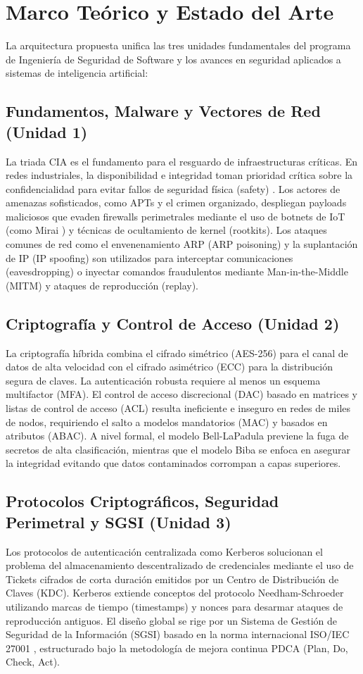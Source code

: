 \documentclass[12pt,letterpaper]{article}
\begin{document}
\section{Marco Teórico y Estado del Arte}

La arquitectura propuesta unifica las tres unidades fundamentales del programa de Ingeniería de Seguridad de Software y los avances en seguridad aplicados a sistemas de inteligencia artificial:

\subsection{Fundamentos, Malware y Vectores de Red (Unidad 1)}
La triada CIA es el fundamento para el resguardo de infraestructuras críticas. En redes industriales, la disponibilidad e integridad toman prioridad crítica sobre la confidencialidad para evitar fallos de seguridad física (safety) \cite{nist800}. Los actores de amenazas sofisticados, como APTs y el crimen organizado, despliegan payloads maliciosos que evaden firewalls perimetrales mediante el uso de botnets de IoT (como Mirai \cite{mirai}) y técnicas de ocultamiento de kernel (rootkits). Los ataques comunes de red como el envenenamiento ARP (ARP poisoning) y la suplantación de IP (IP spoofing) son utilizados para interceptar comunicaciones (eavesdropping) o inyectar comandos fraudulentos mediante Man-in-the-Middle (MITM) y ataques de reproducción (replay).

\subsection{Criptografía y Control de Acceso (Unidad 2)}
La criptografía híbrida combina el cifrado simétrico (AES-256) para el canal de datos de alta velocidad con el cifrado asimétrico (ECC) para la distribución segura de claves. La autenticación robusta requiere al menos un esquema multifactor (MFA). El control de acceso discrecional (DAC) basado en matrices y listas de control de acceso (ACL) resulta ineficiente e inseguro en redes de miles de nodos, requiriendo el salto a modelos mandatorios (MAC) y basados en atributos (ABAC). A nivel formal, el modelo Bell-LaPadula previene la fuga de secretos de alta clasificación, mientras que el modelo Biba se enfoca en asegurar la integridad evitando que datos contaminados corrompan a capas superiores.

\subsection{Protocolos Criptográficos, Seguridad Perimetral y SGSI (Unidad 3)}
Los protocolos de autenticación centralizada como Kerberos solucionan el problema del almacenamiento descentralizado de credenciales mediante el uso de Tickets cifrados de corta duración emitidos por un Centro de Distribución de Claves (KDC). Kerberos extiende conceptos del protocolo Needham-Schroeder utilizando marcas de tiempo (timestamps) y nonces para desarmar ataques de reproducción antiguos. El diseño global se rige por un Sistema de Gestión de Seguridad de la Información (SGSI) basado en la norma internacional ISO/IEC 27001 \cite{iso27001}, estructurado bajo la metodología de mejora continua PDCA (Plan, Do, Check, Act).
\end{document}
